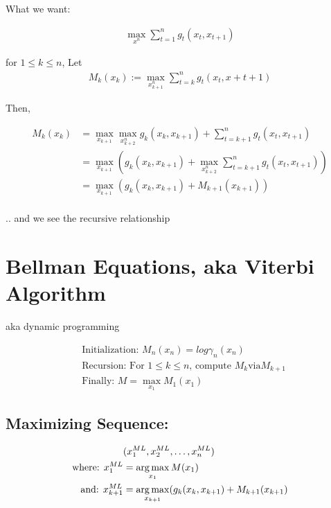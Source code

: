 \documentclass{article}
\begin{document}
What we want:

\begin{align*}
\max_{x^n} \sum_{t=1}^{n} g_t (x_t , x_{t+1})
\end{align*}

\begin{definition}
	for $1 \leq k \leq n$, Let
	\begin{align*}
	M_k (x_k) := \max_{x_{k+1}^{n}} \sum_{t=k}^{n} g_t (x_t, x+{t+1})
	\end{align*}
\end{definition}

Then,

\begin{align*}
M_k (x_k) &= \max_{x_{k+1}} \max_{x_{k+2}^n} g_k (x_k, x_{k+1}) + \sum_{t=k+1}^{n} g_t (x_t, x_{t+1})\\
&=  \max_{x_{k+1}}  (g_k (x_k, x_{k+1}) + \max_{x_{k+2}^{n}}  \sum_{t=k+1}^{n} g_t (x_t, x_{t+1})  ) \\
&=  \max_{x_{k+1}}  (g_k (x_k, x_{k+1}) + M_{k+1}(x_{k+1}  ))\\ 
\end{align*}

.. and we see the recursive relationship

\section{Bellman Equations, aka Viterbi Algorithm}


aka dynamic programming

\begin{align*}
& \text{Initialization: }  M_n(x_n) = log \gamma_n(x_n)\\
& \text{Recursion: For } 1 \leq k \leq n \text{, compute } M_k \text{via} M_{k+1}\\
& \text{Finally: }  M = \max_{x_1} M_1 (x_1)
 \end{align*}
 
 \subsection{Maximizing Sequence:}
 \begin{align*}
 &(x_{1}^{ML}, x_{2}^{ML}, \dots , x_{n}^{ML})\\
 \text{where: } x_{1}^{ML} &= \operatorname*{arg\,max}_{x_1} M(x_1)\\
 \text{and: } x_{k+1}^{ML} &= \operatorname*{arg\,max}_{x_{k+1}} ( g_k(x_k, x_{k+1}) + M_{k+1} (x_{k+1})
 \end{align*}
\end{document}
